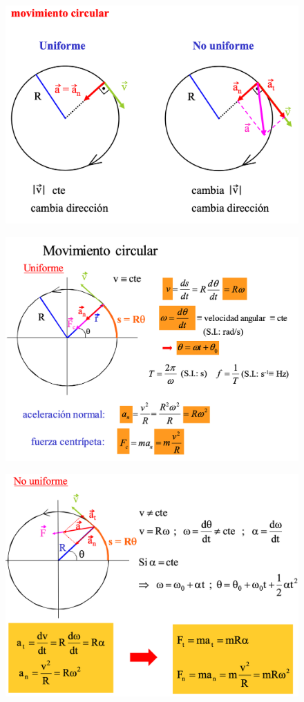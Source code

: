 	\begin{figure}[H]
		\centering
		\includegraphics[width=.6\textwidth]{imagenes/imagenes02/T02IM29.png}
		\end{figure}
	\vspace{-4mm}\begin{figure}[H]
		\centering
		\includegraphics[width=.7\textwidth]{imagenes/imagenes02/T02IM31.png}
		\end{figure}
	\vspace{-5mm}\begin{figure}[H]
		\centering
		\includegraphics[width=.7\textwidth]{imagenes/imagenes02/T02IM32.png}
		\end{figure}


